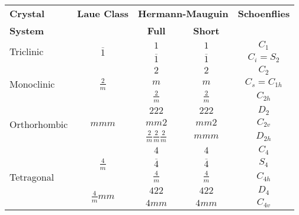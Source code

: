 
\usepackage{multirow}
\def\mytitle{NANO106 Handout 5 - The 32 Crystallographic Point Groups}
\def\latexmode{mavrldoc}


\begin{table}[h]
\centering
\scriptsize
  \begin{tabular}{lcccc}
    \hline
	\textbf{Crystal}           & \textbf{Laue Class}             & \multicolumn{2}{l}{\textbf{Hermann-Mauguin}} & \textbf{Schoenflies}\\
   	\textbf{System}            &                                 & \textbf{Full} & \textbf{Short }              & \\
   	\hline
   	\hline
   	\multirow{2}{*}{Triclinic} & \multirow{2}{*}{$\overline{1}$} & $1$ & $1$ & $C_1$\\
                               &                                 & $\overline{1}$ & $\overline{1}$ & $C_i = S_2$ \\
    \hline
    \multirow{3}{*}{Monoclinic} & \multirow{3}{*}{$\displaystyle \frac{2}{m}$} & $2$ & $2$ & $C_2$\\
                               &                                 & $m$ & $m$ & $C_s = C_{1h}$ \\
                               &                                 & $\displaystyle \frac{2}{m}$ & $\displaystyle \frac{2}{m}$ & $C_{2h}$ \\[1.5ex]
    \hline 
    \multirow{3}{*}{Orthorhombic} & \multirow{3}{*}{$mmm$} & $222$ & $222$ & $D_2$\\
                               &                           & $mm2$ & $mm2$ & $C_{2v}$ \\
                               &                           & $\displaystyle \frac{2}{m}\frac{2}{m}\frac{2}{m}$ & $mmm$ & $D_{2h}$ \\[1.5ex]
    \hline
    \multirow{7}{*}{Tetragonal} & \multirow{3}{*}{$\displaystyle \frac{4}{m}$} & $4$ & $4$ & $C_4$\\
                               &                                 & $\overline{4}$ & $\overline{4}$ & $S_4$ \\
                               &                                 & $\displaystyle \frac{4}{m}$ & $\displaystyle \frac{4}{m}$ & $C_{4h}$ \\[1.5ex]
                               \cline{2-5}
							  & \multirow{4}{*}{$\displaystyle \frac{4}{m}mm$} & $422$ & $422$ & $D_4$\\
                               &                                 & $4mm$ & $4mm$ & $C_{4v}$ \\

\end{tabular}
\end{table}
